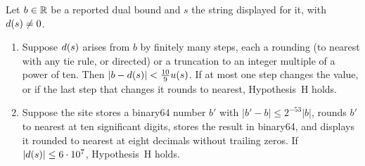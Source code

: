 \begin{lemma}\label{lem:audit-display}
Let $b\in\mathbb{R}$ be a reported dual bound and $s$ the string displayed for it, with $d(s)\neq0$.
\begin{enumerate}
\item[(a)] Suppose $d(s)$ arises from $b$ by finitely many steps, each a rounding (to nearest with any tie rule, or directed) or a truncation to an integer multiple of a power of ten.
Then $|b-d(s)|<\tfrac{10}{9}u(s)$.
If at most one step changes the value, or if the last step that changes it rounds to nearest, Hypothesis~H holds.
\item[(b)] Suppose the site stores a binary64 number $b'$ with $|b'-b|\le 2^{-53}|b|$, rounds $b'$ to nearest at ten significant digits, stores the result in binary64, and displays it rounded to nearest at eight decimals without trailing zeros.
If $|d(s)|\le 6\cdot10^{7}$, Hypothesis~H holds.
\end{enumerate}
\end{lemma}

